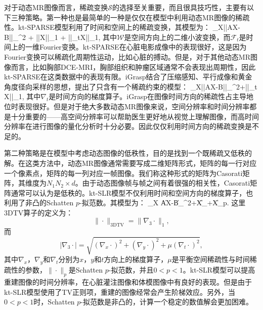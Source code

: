 对于动态MR图像而言，稀疏变换$\mathcal{S}$的选择至关重要，而且很具技巧性，主要有以下三种策略。第一种也是最简单的一种是仅仅在模型中利用动态MR图像的稀疏性。kt-SPARSE\cite{lustig2006}模型利用了时间和空间上的稀疏变换，其模型为：
\beq
\min_X||AX-B||_{}^2 + \alpha||X||_1 + \beta||_tX||_1,
\eeq
其中$\mathcal{W}$是空间方向上的二维小波变换，而$\mathcal{F}_t$是时间上的一维Fourier变换。kt-SPARSE在心脏电影成像中的表现很好，这是因为Fourier变换可以稀疏化周期性运动，比如心脏的搏动。但是，对于其他动态MR图像而言，比如胸部DCE-MRI，胸部组织和肿瘤区域通常不会表现出周期性，因此kt-SPARSE在这类数据中的表现有限。iGrasp\cite{igrasp}结合了压缩感知、平行成像和黄金角度径向采样的思想，提出了只含有一个稀疏约束的模型：
\beq
\min_X||AX-B||_{}^2+\alpha||\nabla_t X||_1,
\eeq
其中$\nabla_t$是时间方向的梯度算子。iGrasp在图像时间方向的稀疏性占主导地位时表现很好。但是对于绝大多数动态MR图像来说，空间分辨率和时间分辨率都是十分重要的——高空间分辨率可以帮助医生更好地从视觉上理解图像，而高时间分辨率在进行图像的量化分析时十分必要。因此仅仅利用时间方向的稀疏变换是不足的。

第二种策略是在模型中考虑动态图像的低秩性，目的是找到一个既稀疏又低秩的解。在这类方法中，动态MR图像通常需要写成二维矩阵形式，矩阵的每一行对应一个像素点，矩阵的每一列对应一帧图像。我们称这种形式的矩阵为Casorati矩阵，其维度为$N_1N_2\times d$。由于动态图像帧与帧之间有着很强的相关性，Casorati矩阵通常可以认为是低秩的。kt-SLR模型\cite{Sajan2011Accelerated}不仅利用时间和空间方向的梯度算子，也利用了非凸的Schatten $p$-拟范数。其模型为：
\beq
\min_X \|AX-B\|_{}^2+\alpha\|X\|_{}+\beta\|X\|_{p}.
\eeq
这里3DTV算子的定义为：
$$
\|\cdot\|_{\mathrm{3DTV}}=\|\nabla_3\cdot\|_1,
$$
而
$$
|\nabla_3\cdot| = \sqrt{(\nabla_x\cdot)^2+(\nabla_y\cdot)^2+\mu(\nabla_t\cdot)^2},
$$
其中$\nabla_x$，$\nabla_y$和$\nabla_t$分别为$x$，$y$和$t$方向上的梯度算子，$\mu$是平衡空间稀疏性与时间稀疏性的参数，$\|\cdot\|_{p}$是Schatten $p$-拟范数，并且$0<p<1$。kt-SLR模型可以提高重建图像的时间分辨率，在心脏灌注图像和体模图像中有良好的表现。但是由于kt-SLR模型使用了TV正则项，重建的图像经常会产生阶梯效应。另外，当$0<p<1$时，Schatten $p$-拟范数是非凸的，计算一个稳定的数值解会更加困难。

